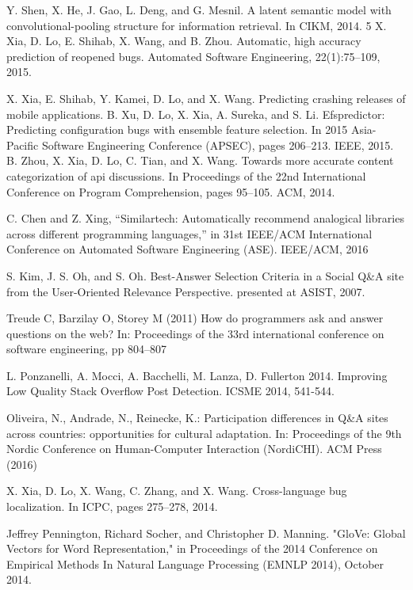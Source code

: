 \begin{thebibliography}{1}
   Y. Shen, X. He, J. Gao, L. Deng, and G. Mesnil. A latent semantic model with convolutional-pooling structure for information retrieval. In CIKM, 2014. 5 
 X. Xia, D. Lo, E. Shihab, X. Wang, and B. Zhou. Automatic, high accuracy prediction of reopened bugs. Automated Software Engineering, 22(1):75–109, 2015. 

  X. Xia, E. Shihab, Y. Kamei, D. Lo, and X. Wang. Predicting crashing releases of mobile applications. 
 B. Xu, D. Lo, X. Xia, A. Sureka, and S. Li. Efspredictor: Predicting configuration bugs with ensemble feature selection. In 2015 Asia-Pacific Software Engineering Conference (APSEC), pages 206–213. IEEE, 2015.
B. Zhou, X. Xia, D. Lo, C. Tian, and X. Wang. Towards more accurate content categorization of api discussions. In Proceedings of the 22nd International Conference on Program Comprehension, pages 95–105. ACM, 2014.

 C. Chen and Z. Xing, “Similartech: Automatically recommend analogical libraries across different programming languages,” in 31st IEEE/ACM International Conference on Automated Software Engineering (ASE). IEEE/ACM, 2016

S. Kim, J. S. Oh, and S. Oh. Best-Answer Selection Criteria in a Social Q\&A site from the User-Oriented Relevance Perspective. presented at ASIST, 2007.

Treude C, Barzilay O, Storey M (2011) How do programmers ask and answer questions on the web? In: Proceedings of the 33rd international conference on software engineering, pp 804–807

L. Ponzanelli, A. Mocci, A. Bacchelli, M. Lanza, D. Fullerton 2014. Improving Low Quality Stack Overflow Post Detection. ICSME 2014, 541-544. 

Oliveira, N., Andrade, N., Reinecke, K.: Participation differences in Q\&A sites across countries: opportunities for cultural adaptation. In: Proceedings of the 9th Nordic Conference on Human-Computer Interaction (NordiCHI). ACM Press (2016)

X. Xia, D. Lo, X. Wang, C. Zhang, and X. Wang. Cross-language bug localization. In ICPC, pages 275–278, 2014.

Jeffrey Pennington, Richard Socher, and Christopher D. Manning. "GloVe: Global Vectors for Word Representation," in Proceedings of the 2014 Conference on Empirical Methods In Natural Language Processing (EMNLP 2014), October 2014. 


\end{thebibliography}
